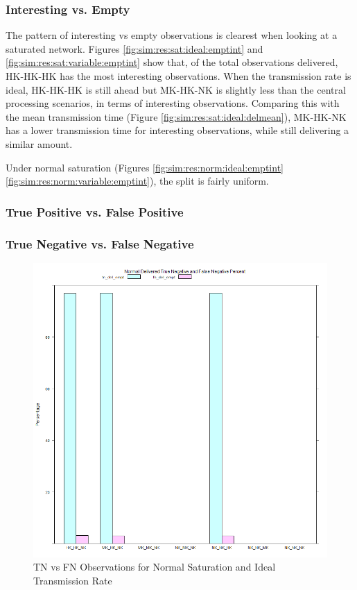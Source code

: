 \subsubsection{Interesting vs. Empty}
	The pattern of interesting vs empty observations is clearest when looking at a saturated network. Figures \ref{fig:sim:res:sat:ideal:emptint} and \ref{fig:sim:res:sat:variable:emptint} show that, of the total observations delivered, HK-HK-HK has the most interesting observations. When the transmission rate is ideal, HK-HK-HK is still ahead but MK-HK-NK is slightly less than the central processing scenarios, in terms of interesting observations. Comparing this with the mean transmission time (Figure \ref{fig:sim:res:sat:ideal:delmean}), MK-HK-NK has a lower transmission time for interesting observations, while still delivering a similar amount.

	Under normal saturation (Figures \ref{fig:sim:res:norm:ideal:emptint}\ref{fig:sim:res:norm:variable:emptint}), the split is fairly uniform. 





\subsubsection{True Positive vs. False Positive}







\subsubsection{True Negative vs. False Negative}
	
	\begin{figure}[H]
	\centering
	\includegraphics[width=\textwidth]{Chap7/figures/plots/normal_ideal/tnvsfn_percent.png}
	\caption{TN vs FN Observations for Normal Saturation and Ideal Transmission Rate}
	\label{fig:sim:res:norm:ideal:tnfn}
	\end{figure}

